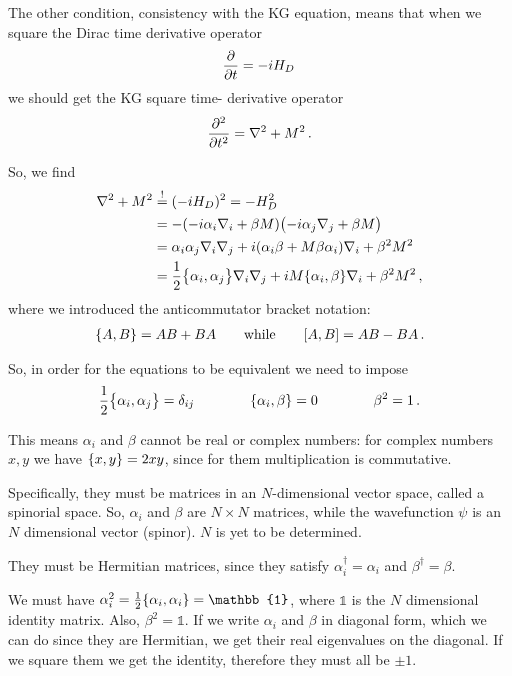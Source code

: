 \documentclass[main.tex]{subfiles}
\begin{document}
The other condition, consistency with the KG equation, means that when we square the Dirac time derivative operator 
%
\begin{align}
\pdv{}{t} = -i H_D
\,
\end{align}
%
we should get the KG square time- derivative operator 
%
\begin{align}
\pdv[2]{}{t} = \nabla^2 + M^2
\,.
\end{align}

So, we find 
%
\begin{subequations}
\begin{align}
\nabla^2 + M^2 &\overset{!}{=} (-i H_D)^2 = - H_D^2  \\
&= -\qty(-i \alpha_{i}  \nabla_{i} + \beta M) \qty(-i \alpha_{j} \nabla_{j} + \beta M)  \\
&= \alpha_{i} \alpha_{j} \nabla_{i} \nabla_{j} + i \qty(\alpha_{i} \beta  + M \beta \alpha_{i}) \nabla_{i} + \beta^2 M^2 \\
&= \frac{1}{2} \qty{\alpha_{i}, \alpha_{j}} \nabla_{i} \nabla_{j} 
+ iM \qty{\alpha_{i}, \beta } \nabla_{i} + \beta^2M^2
\,,
\end{align}
\end{subequations}
%
where we introduced the anticommutator bracket notation: 
%
\begin{align}
\qty{A, B} = AB + BA
\qquad \text{while} \qquad
\qty[A, B] = AB - BA
\,.
\end{align}

So, in order for the equations to be equivalent we need to impose 
%
\begin{align}
\frac{1}{2}\qty{\alpha_{i}, \alpha_{j}} = \delta_{ij}
\qquad \qquad 
\qty{\alpha_{i}, \beta } = 0
\qquad \qquad 
\beta^2 = 1
\,.
\end{align}

This means \(\alpha_{i}\) and \(\beta \) cannot be real or complex numbers: for complex numbers \(x, y\) we have \(\qty{x, y} = 2 xy \),  since for them multiplication is commutative. 

Specifically, they must be matrices in an \(N\)-dimensional vector space, called a spinorial space. 
So, \(\alpha_{i}\) and \(\beta \) are \(N \times N\) matrices, while the wavefunction \(\psi \) is an \(N\) dimensional vector (spinor). \(N\) is yet to be determined.

They must be Hermitian matrices, since they satisfy \(\alpha_{i} ^\dag = \alpha_{i}\) and \(\beta ^\dag = \beta \).

We must have \(\alpha_{i}^2 = \frac{1}{2} \qty{\alpha_{i}, \alpha_{i}} = \mathbb{1}\), where \(\mathbb{1}\) is the \(N\) dimensional identity matrix. Also, \(\beta^2 = \mathbb{1}\). 
If we write \(\alpha_{i}\) and \(\beta \) in diagonal form, which we can do since they are Hermitian, we get their real eigenvalues on the diagonal. If we square them we get the identity, therefore they must all be \(\pm 1\). 
\end{document}
